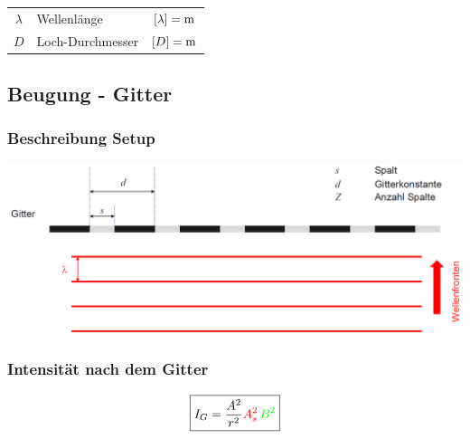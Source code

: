 \renewcommand{\arraystretch}{1.1}
\begin{tabular}{clc}
$\lambda$ & Wellenlänge & $[\lambda]= \mathrm{m}$ \\
$D$ & Loch-Durchmesser & $[D] = \mathrm{m}$
\end{tabular}
\renewcommand{\arraystretch}{1}



\subsection{Beugung - Gitter}

\subsubsection{Beschreibung Setup}
\includegraphics[width=0.9\linewidth]{Bilder/Wellen-Optik/beugung_gitter} 


\subsubsection{Intensität nach dem Gitter}

$$ \boxed{ I_G = \frac{A^2}{r^2} \textcolor{red}{A_s^2} \, \textcolor{green}{B^2} }$$




